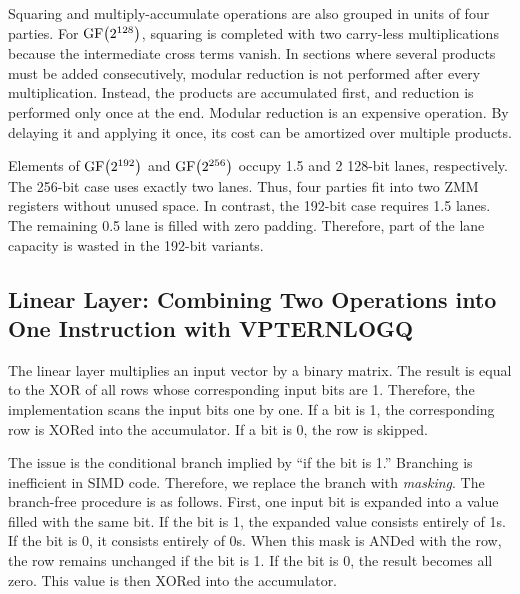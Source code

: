 Squaring and multiply-accumulate operations are also grouped in units
of four parties. For $\operatorname{GF}\bigl(2^{128}\bigr)$, squaring is completed with two
carry-less multiplications because the intermediate cross terms vanish. In sections where several products must be added consecutively, modular reduction is not performed after every multiplication. Instead, the products are accumulated first, and reduction is performed only once at the end. Modular reduction is an expensive operation. By delaying it and applying it once, its cost can be amortized over multiple products.

Elements of $\operatorname{GF}\bigl(2^{192}\bigr)$ and $\operatorname{GF}\bigl(2^{256}\bigr)$ occupy 1.5 and 2 128-bit lanes, respectively. The 256-bit case uses exactly two lanes. Thus, four parties fit into two ZMM registers without unused space. In contrast, the 192-bit case requires 1.5 lanes. The remaining 0.5 lane is filled with zero padding. Therefore, part of the lane capacity is wasted in the 192-bit variants.

\subsection{Linear Layer: Combining Two Operations into One Instruction with VPTERNLOGQ}
\label{sec:matmul}

The linear layer multiplies an input vector by a binary matrix. The result is equal to the XOR of all rows whose corresponding input bits are 1. Therefore, the implementation scans the input bits one by one. If a bit is 1, the corresponding row is XORed into the accumulator. If a bit is 0, the row is skipped.

The issue is the conditional branch implied by ``if the bit is 1.'' Branching is inefficient in SIMD code. Therefore, we replace the branch with \emph{masking}. The branch-free procedure is as follows. First, one input bit is expanded into a value filled with the same bit. If the bit is 1, the expanded value consists entirely of 1s. If the bit is 0, it consists entirely of 0s. When this mask is ANDed with the row, the row remains unchanged if the bit is 1. If the bit is 0, the result becomes all zero. This value is then XORed into the accumulator.

